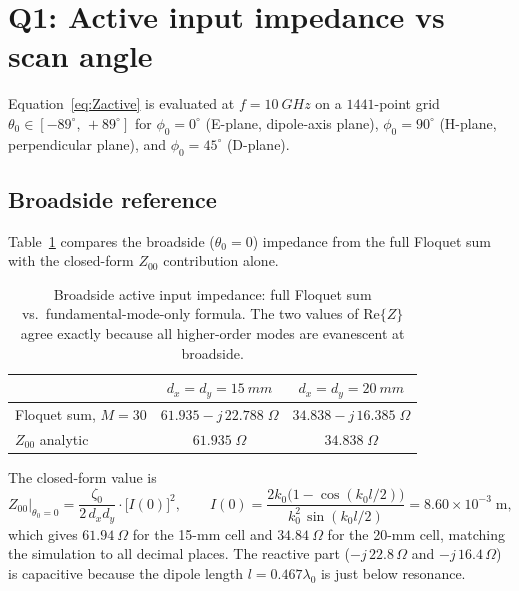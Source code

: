 \documentclass{article}
\begin{document}
\section{Q1: Active input impedance vs scan angle}

Equation~\eqref{eq:Zactive} is evaluated at $f = \SI{10}{GHz}$ on a $1441$-point grid $\theta_0 \in [-89^\circ,\,+89^\circ]$ for $\phi_0 = 0^\circ$ (E-plane, dipole-axis plane), $\phi_0 = 90^\circ$ (H-plane, perpendicular plane), and $\phi_0 = 45^\circ$ (D-plane).

\subsection{Broadside reference}

Table~\ref{tab:broadside} compares the broadside ($\theta_0 = 0$) impedance from the full Floquet sum with the closed-form $Z_{00}$ contribution alone.

\begin{table}[H]
\centering
\caption{Broadside active input impedance: full Floquet sum vs.\ fundamental-mode-only formula. The two values of Re$\{Z\}$ agree exactly because all higher-order modes are evanescent at broadside.}
\label{tab:broadside}
\begin{tabular}{@{}lcc@{}}
\toprule
& $d_x = d_y = \SI{15}{mm}$ & $d_x = d_y = \SI{20}{mm}$ \\
\midrule
Floquet sum, $M=30$ & $61.935 - j\,22.788\;\Omega$ & $34.838 - j\,16.385\;\Omega$ \\
$Z_{00}$ analytic   & $61.935\;\Omega$            & $34.838\;\Omega$            \\
\bottomrule
\end{tabular}
\end{table}

The closed-form value is
\begin{equation}\label{eq:Z00}
Z_{00}\big|_{\theta_0=0} = \frac{\zeta_0}{2\,d_x d_y}\cdot\big[I(0)\big]^2,\qquad
I(0) = \frac{2k_0\big(1 - \cos(k_0 l/2)\big)}{k_0^2\,\sin(k_0 l/2)} = 8.60\times10^{-3}\;\text{m},
\end{equation}
which gives $\SI{61.94}{\Omega}$ for the 15-mm cell and $\SI{34.84}{\Omega}$ for the 20-mm cell, matching the simulation to all decimal places. The reactive part ($-j\,22.8\,\Omega$ and $-j\,16.4\,\Omega$) is capacitive because the dipole length $l = 0.467\lambda_0$ is just below resonance.
\end{document}
